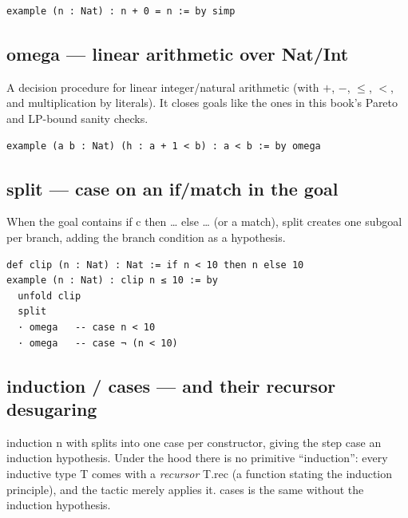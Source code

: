 \documentclass[11pt, a4paper, oneside]{book}
\newcommand{\li}[1]{{\ttfamily\small\color{deepblue}#1}}
\begin{document}
\begin{leanbox}
\begin{verbatim}
example (n : Nat) : n + 0 = n := by simp
\end{verbatim}
\end{leanbox}

\subsection*{\li{omega} --- linear arithmetic over \li{Nat}/\li{Int}}
A decision procedure for linear integer/natural arithmetic (with $+$, $-$,
$\leq$, $<$, and multiplication by literals).  It closes goals like the ones in
this book's Pareto and LP-bound sanity checks.

\begin{leanbox}
\begin{verbatim}
example (a b : Nat) (h : a + 1 < b) : a < b := by omega
\end{verbatim}
\end{leanbox}

\subsection*{\li{split} --- case on an \li{if}/\li{match} in the goal}
When the goal contains \li{if c then … else …} (or a \li{match}), \li{split}
creates one subgoal per branch, adding the branch condition as a hypothesis.

\begin{leanbox}
\begin{verbatim}
def clip (n : Nat) : Nat := if n < 10 then n else 10
example (n : Nat) : clip n ≤ 10 := by
  unfold clip
  split
  · omega   -- case n < 10
  · omega   -- case ¬ (n < 10)
\end{verbatim}
\end{leanbox}

\subsection*{\li{induction} / \li{cases} --- and their recursor desugaring}
\li{induction n with} splits into one case per constructor, giving the step case
an induction hypothesis.  Under the hood there is no primitive ``induction'':
every \li{inductive} type \li{T} comes with a \emph{recursor} \li{T.rec} (a
function stating the induction principle), and the tactic merely applies it.
\li{cases} is the same without the induction hypothesis.
\end{document}
